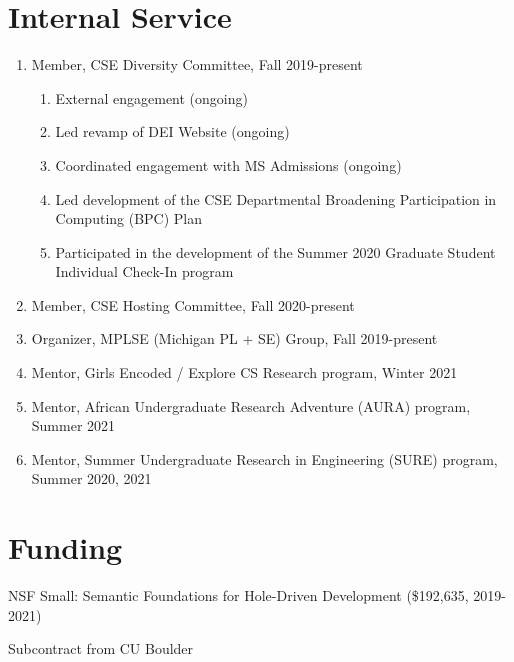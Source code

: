\documentclass[10pt,letterpaper]{article}
\renewenvironment{itemize}{
  \begin{list}{}{
    \setlength{\leftmargin}{1.25em}
    \setlength{\itemsep}{0.25em}
    \setlength{\parskip}{0pt}
    \setlength{\parsep}{0.2em}
  }
}{
  \end{list}
}
\begin{document}
\section*{Internal Service}
\begin{enumerate}
  \item Member, CSE Diversity Committee, Fall 2019-present
    \begin{enumerate}
      \item External engagement (ongoing)
      \item Led revamp of DEI Website (ongoing)
      \item Coordinated engagement with MS Admissions (ongoing)
      \item Led development of the CSE Departmental Broadening Participation in Computing (BPC) Plan  
      \item Participated in the development of the Summer 2020 Graduate Student Individual Check-In program
    \end{enumerate}
  \item Member, CSE Hosting Committee, Fall 2020-present
  \item Organizer, MPLSE (Michigan PL + SE) Group, Fall 2019-present
  \item Mentor, Girls Encoded / Explore CS Research program, Winter 2021
  \item Mentor, African Undergraduate Research Adventure (AURA) program, Summer 2021
  \item Mentor, Summer Undergraduate Research in Engineering (SURE) program, Summer 2020, 2021
\end{enumerate}


\section*{Funding}

\begin{itemize}
  \item NSF Small: Semantic Foundations for Hole-Driven Development (\$192,635, 2019-2021)
    \begin{itemize}
      \item Subcontract from CU Boulder
    \end{itemize}
\end{itemize}

\end{document}
